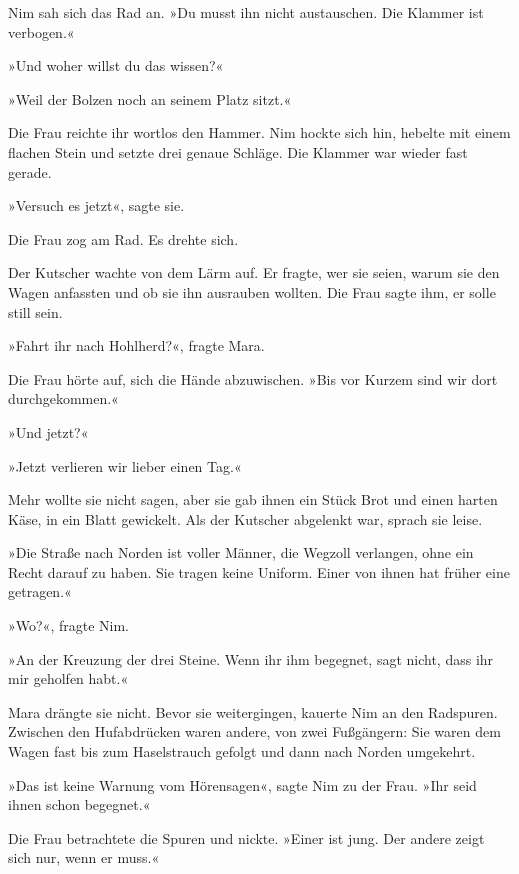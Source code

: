 \documentclass[10pt,a4paper]{article}
\begin{document}
Nim sah sich das Rad an. »Du musst ihn nicht austauschen. Die Klammer ist verbogen.«

»Und woher willst du das wissen?«

»Weil der Bolzen noch an seinem Platz sitzt.«

Die Frau reichte ihr wortlos den Hammer. Nim hockte sich hin, hebelte mit einem flachen Stein und setzte drei genaue Schläge. Die Klammer war wieder fast gerade.

»Versuch es jetzt«, sagte sie.

Die Frau zog am Rad. Es drehte sich.

Der Kutscher wachte von dem Lärm auf. Er fragte, wer sie seien, warum sie den Wagen anfassten und ob sie ihn ausrauben wollten. Die Frau sagte ihm, er solle still sein.

»Fahrt ihr nach Hohlherd?«, fragte Mara.

Die Frau hörte auf, sich die Hände abzuwischen. »Bis vor Kurzem sind wir dort durchgekommen.«

»Und jetzt?«

»Jetzt verlieren wir lieber einen Tag.«

Mehr wollte sie nicht sagen, aber sie gab ihnen ein Stück Brot und einen harten Käse, in ein Blatt gewickelt. Als der Kutscher abgelenkt war, sprach sie leise.

»Die Straße nach Norden ist voller Männer, die Wegzoll verlangen, ohne ein Recht darauf zu haben. Sie tragen keine Uniform. Einer von ihnen hat früher eine getragen.«

»Wo?«, fragte Nim.

»An der Kreuzung der drei Steine. Wenn ihr ihm begegnet, sagt nicht, dass ihr mir geholfen habt.«

Mara drängte sie nicht. Bevor sie weitergingen, kauerte Nim an den Radspuren. Zwischen den Hufabdrücken waren andere, von zwei Fußgängern: Sie waren dem Wagen fast bis zum Haselstrauch gefolgt und dann nach Norden umgekehrt.

»Das ist keine Warnung vom Hörensagen«, sagte Nim zu der Frau. »Ihr seid ihnen schon begegnet.«

Die Frau betrachtete die Spuren und nickte. »Einer ist jung. Der andere zeigt sich nur, wenn er muss.«
\end{document}

